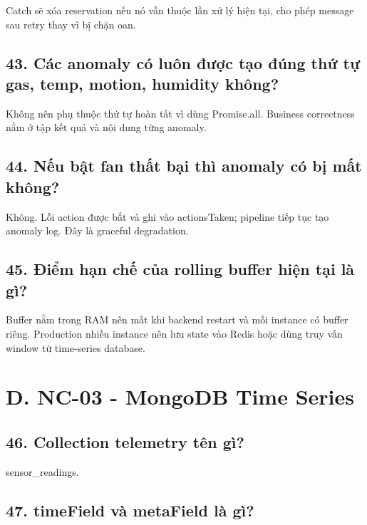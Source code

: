 \documentclass[11pt,oneside,openany]{book}
\renewcommand{\texttt}[1]{{\ttfamily\small #1}}
\begin{document}
Catch sẽ xóa reservation nếu nó vẫn thuộc lần xử lý hiện tại, cho phép
message sau retry thay vì bị chặn oan.

\subsection{43. Các anomaly có luôn được tạo đúng thứ tự gas, temp,
motion, humidity
không?}\label{43-cuxe1c-anomaly-cuxf3-luuxf4n-ux111ux1b0ux1ee3c-tux1ea1o-ux111uxfang-thux1ee9-tux1ef1-gas-temp-motion-humidity-khuxf4ng}

Không nên phụ thuộc thứ tự hoàn tất vì dùng \texttt{Promise.all}.
Business correctness nằm ở tập kết quả và nội dung từng anomaly.

\subsection{44. Nếu bật fan thất bại thì anomaly có bị mất
không?}\label{44-nux1ebfu-bux1eadt-fan-thux1ea5t-bux1ea1i-thuxec-anomaly-cuxf3-bux1ecb-mux1ea5t-khuxf4ng}

Không. Lỗi action được bắt và ghi vào \texttt{actionsTaken}; pipeline
tiếp tục tạo anomaly log. Đây là graceful degradation.

\subsection{45. Điểm hạn chế của rolling buffer hiện tại là
gì?}\label{45-ux111iux1ec3m-hux1ea1n-chux1ebf-cux1ee7a-rolling-buffer-hiux1ec7n-tux1ea1i-luxe0-guxec}

Buffer nằm trong RAM nên mất khi backend restart và mỗi instance có
buffer riêng. Production nhiều instance nên lưu state vào Redis hoặc
dùng truy vấn window từ time-series database.

\section{D. NC-03 - MongoDB Time
Series}\label{d-nc-03---mongodb-time-series}

\subsection{46. Collection telemetry tên
gì?}\label{46-collection-telemetry-tuxean-guxec}

\texttt{sensor\_readings}.

\subsection{\texorpdfstring{47. \texttt{timeField} và \texttt{metaField}
là
gì?}{47. timeField và metaField là gì?}}\label{47-timefield-vuxe0-metafield-luxe0-guxec}
\end{document}
